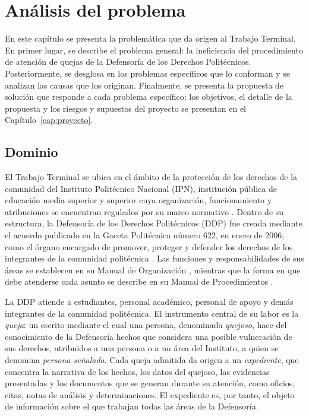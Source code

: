\chapter{Análisis del problema}
\label{cap:analisis_problema}
En este capítulo se presenta la problemática que da origen al Trabajo Terminal. En primer lugar, se describe el problema general: la ineficiencia del procedimiento de atención de quejas de la Defensoría de los Derechos Politécnicos. Posteriormente, se desglosa en los problemas específicos que lo conforman y se analizan las causas que los originan. Finalmente, se presenta la propuesta de solución que responde a cada problema específico; los objetivos, el detalle de la propuesta y los riesgos y supuestos del proyecto se presentan en el Capítulo~\ref{cap:proyecto}.

\section{Dominio}
\label{sec:dominio}
El Trabajo Terminal se ubica en el ámbito de la protección de los derechos de la comunidad del Instituto Politécnico Nacional (IPN), institución pública de educación media superior y superior cuya organización, funcionamiento y atribuciones se encuentran regulados por su marco normativo \cite{ipn_ley_organica}. Dentro de su estructura, la Defensoría de los Derechos Politécnicos (DDP) fue creada mediante el acuerdo publicado en la Gaceta Politécnica número 622, en enero de 2006, como el órgano encargado de promover, proteger y defender los derechos de los integrantes de la comunidad politécnica \cite{ipn_acuerdo622}. Las funciones y responsabilidades de sus áreas se establecen en su Manual de Organización \cite{ipn_manual_organizacion_ddp}, mientras que la forma en que debe atenderse cada asunto se describe en su Manual de Procedimientos \cite{ipn_manual_procedimientos_ddp}.

	La DDP atiende a estudiantes, personal académico, personal de apoyo y demás integrantes de la comunidad politécnica. El instrumento central de su labor es la \emph{queja}: un escrito mediante el cual una persona, denominada \emph{quejoso}, hace del conocimiento de la Defensoría hechos que considera una posible vulneración de sus derechos, atribuidos a una persona o a un área del Instituto, a quien se denomina \emph{persona señalada}. Cada queja admitida da origen a un \emph{expediente}, que concentra la narrativa de los hechos, los datos del quejoso, las evidencias presentadas y los documentos que se generan durante su atención, como oficios, citas, notas de análisis y determinaciones. El expediente es, por tanto, el objeto de información sobre el que trabajan todas las áreas de la Defensoría.

